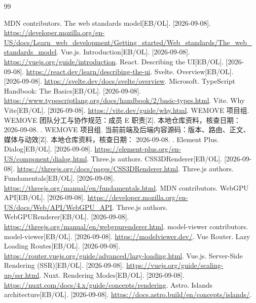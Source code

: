 \begin{thebibliography}{99}
\small\setlength{\itemsep}{0.55em}
MDN contributors. The web standards model[EB/OL]. [2026-09-08].
\url{https://developer.mozilla.org/en-US/docs/Learn_web_development/Getting_started/Web_standards/The_web_standards_model}.
Vue.js. Introduction[EB/OL]. [2026-09-08].
\url{https://vuejs.org/guide/introduction}.
React. Describing the UI[EB/OL]. [2026-09-08].
\url{https://react.dev/learn/describing-the-ui}.
Svelte. Overview[EB/OL]. [2026-09-08].
\url{https://svelte.dev/docs/svelte/overview}.
Microsoft. TypeScript Handbook: The Basics[EB/OL]. [2026-09-08].
\url{https://www.typescriptlang.org/docs/handbook/2/basic-types.html}.
Vite. Why Vite[EB/OL]. [2026-09-08].
\url{https://vite.dev/guide/why.html}.
WEMOVE 项目组. WEMOVE 团队分工与协作规范：成员 E 职责[Z]. 本地仓库资料，核查日期：2026-09-08.
.
WEMOVE 项目组. 当前前端及后端内容源码：版本、路由、正文、媒体与动效[Z]. 本地仓库资料，核查日期：%
2026-09-08.
.
Element Plus. Dialog[EB/OL]. [2026-09-08].
\url{https://element-plus.org/en-US/component/dialog.html}.
Three.js authors. CSS3DRenderer[EB/OL]. [2026-09-08].
\url{https://threejs.org/docs/pages/CSS3DRenderer.html}.
Three.js authors. Fundamentals[EB/OL]. [2026-09-08].
\url{https://threejs.org/manual/en/fundamentals.html}.
MDN contributors. WebGPU API[EB/OL]. [2026-09-08].
\url{https://developer.mozilla.org/en-US/docs/Web/API/WebGPU_API}.
Three.js authors. WebGPURenderer[EB/OL]. [2026-09-08].
\url{https://threejs.org/manual/en/webgpurenderer.html}.
model-viewer contributors. model-viewer[EB/OL]. [2026-09-08].
\url{https://modelviewer.dev/}.
Vue Router. Lazy Loading Routes[EB/OL]. [2026-09-08].
\url{https://router.vuejs.org/guide/advanced/lazy-loading.html}.
Vue.js. Server-Side Rendering (SSR)[EB/OL]. [2026-09-08].
\url{https://vuejs.org/guide/scaling-up/ssr.html}.
Nuxt. Rendering Modes[EB/OL]. [2026-09-08].
\url{https://nuxt.com/docs/4.x/guide/concepts/rendering}.
Astro. Islands architecture[EB/OL]. [2026-09-08].
\url{https://docs.astro.build/en/concepts/islands/}.

\end{thebibliography}
